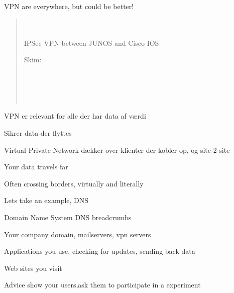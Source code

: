 \documentclass[Screen16to9,17pt]{foils}
\begin{document}

VPN are everywhere, but could be better!

\begin{quote}
\\
\\
IPSec VPN between JUNOS and Cisco IOS

Skim:\\
\\
\\
\\
\\
\end{quote}




\begin{list2}
\item VPN er relevant for alle der har data af værdi
\item Sikrer data der flyttes
\item Virtual Private Network dækker over klienter der kobler op, og site-2-site
\end{list2}



\begin{list2}
\item Your data travels far
\item Often crossing borders, virtually and literally
\end{list2}


\begin{list1}
\item Lets take an example, DNS
\item Domain Name System DNS breadcrumbs
\begin{list2}
\item Your company domain, mailservers, vpn servers
\item Applications you use, checking for updates, sending back data
\item Web sites you visit
\end{list2}
\vskip 1cm
\item Advice show your users,ask them to participate in a experiment
\end{list1}
\end{document}
